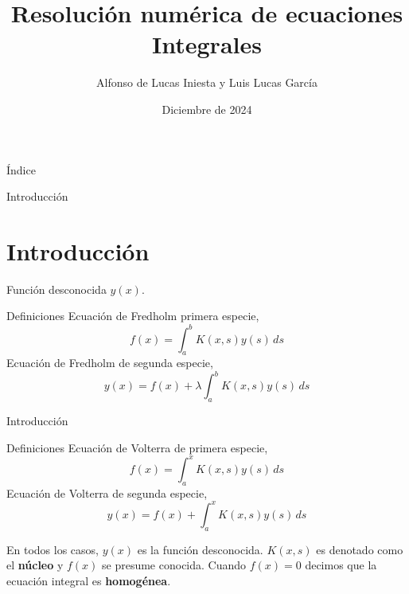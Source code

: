 \documentclass{beamer}
\title[Ecuaciones Integrales]{Resolución numérica de ecuaciones Integrales}
\author[Alfonso y Luis]{Alfonso de Lucas Iniesta y Luis Lucas García}
\institute[UA]{Universidad de Alicante - Facultad de Ciencias - Grado en física}
\date{Diciembre de 2024}
\begin{document}
\maketitle

\begin{frame}{Índice}
    \tableofcontents
\end{frame}

\begin{frame}{Introducción}
    \section{Introducción}
    Función desconocida $y(x)$.
    \begin{block}{Definiciones \cite{navarro2011ecuaciones}}
        Ecuación de Fredholm primera especie,
        \begin{equation}
            f(x)= \int_a^b K(x, s) y(s) \, ds
        \end{equation}
        Ecuación de Fredholm de segunda especie,
        \begin{equation}
            y(x)= f(x)+\lambda\int_a^b K(x, s) y(s) \, ds
        \end{equation}
    \end{block}  
\end{frame}

\begin{frame}{Introducción}
    \begin{block}{Definiciones}
         Ecuación de Volterra de primera especie,
        \begin{equation}
            f(x)= \int_a^x K(x, s) y(s) \, ds
        \end{equation}
        Ecuación de Volterra de segunda especie,
        \begin{equation}
             y(x)= f(x)+\int_a^x K(x, s) y(s) \, ds
             \label{Volterra 2es}
        \end{equation}
    \end{block}
    En todos los casos, $y(x)$ es la función desconocida. $K(x,s)$ es denotado como el \textbf{núcleo} y $f(x)$ se presume conocida.
    Cuando $f(x)= 0$ decimos que la ecuación integral es \textbf{homogénea}.
\end{frame}
\end{document}
